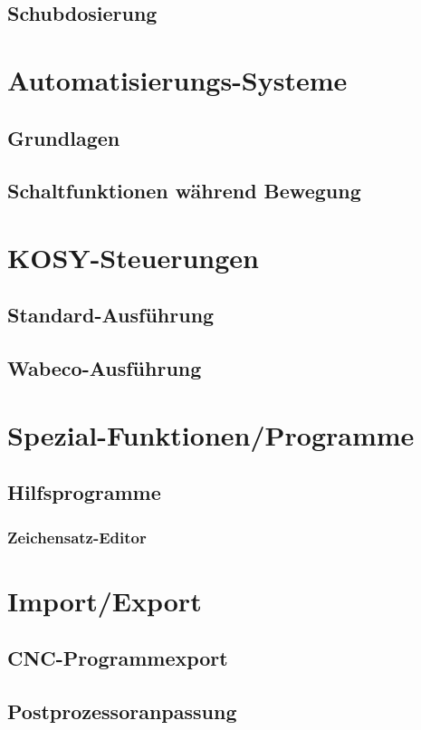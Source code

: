 \documentclass[14pt,a4paper]{book}
\begin{document}
	\section{Schubdosierung} 
 
\chapter{Automatisierungs-Systeme}
	\section{Grundlagen} 
	\section{Schaltfunktionen während Bewegung} 
 
\chapter{KOSY-Steuerungen} 
	\section{Standard-Ausführung} 
	\section{Wabeco-Ausführung} 

\chapter{Spezial-Funktionen/Programme} 
	\section{Hilfsprogramme} 
		\subsection{Zeichensatz-Editor} 

\chapter{Import/Export} 
	\section{CNC-Programmexport} 
	\section{Postprozessoranpassung} 
\end{document}
